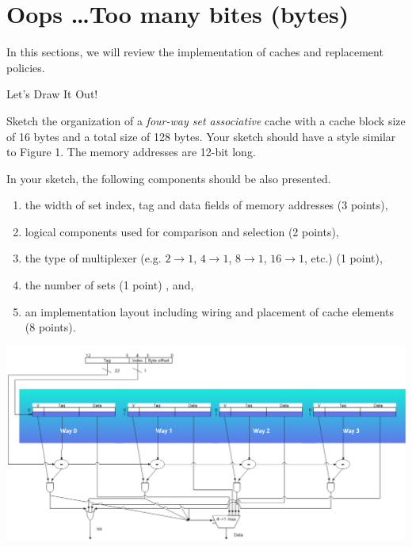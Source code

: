 \section{Oops \dots Too many bites (bytes)}
In this sections, we will review the implementation of caches and
replacement policies.

\begin{questions}

\question[15] Let's Draw It Out!

Sketch the organization of a \emph{four-way set associative} cache
with a cache block size of 16 bytes and a total size of 128 bytes.
Your sketch should have a style similar to Figure 1. The memory
addresses are 12-bit long.

In your sketch, the following components should be also presented.

\begin{enumerate}
    \item the width of set index, tag and data fields of memory
    addresses (3 points),
    \item logical components used for comparison and selection
    (2 points),
    \item the type of multiplexer (e.g. $2\rightarrow1$,
    $4\rightarrow1$, $8\rightarrow1$, $16\rightarrow1$, etc.)
    (1 point),
    \item the number of sets (1 point) , and,
    \item an implementation layout including wiring and placement
    of cache elements (8 points).
\end{enumerate}



{
    \begin{solution}

        \centering
        \includegraphics[width=15cm]{img/four way.png}


\end{solution}}
\end{questions}

